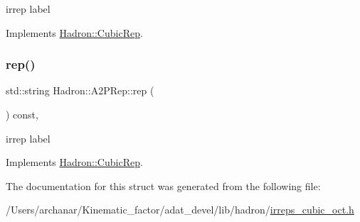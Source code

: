 irrep label 

Implements \mbox{\hyperlink{structHadron_1_1CubicRep_ac3eb63608803d44c68681f158e14eb1b}{Hadron\+::\+Cubic\+Rep}}.

\mbox{\label{structHadron_1_1A2PRep_aa2ba2d1bc832b1d1fdba1befcfe8a256}} 
\subsubsection{\texorpdfstring{rep()}{rep()}\hspace{0.1cm}{\footnotesize\ttfamily [2/2]}}
{\footnotesize\ttfamily std\+::string Hadron\+::\+A2\+P\+Rep\+::rep (\begin{DoxyParamCaption}{ }\end{DoxyParamCaption}) const\hspace{0.3cm}{\ttfamily [inline]}, {\ttfamily [virtual]}}

irrep label 

Implements \mbox{\hyperlink{structHadron_1_1CubicRep_ac3eb63608803d44c68681f158e14eb1b}{Hadron\+::\+Cubic\+Rep}}.



The documentation for this struct was generated from the following file\+:\begin{DoxyCompactItemize}
\item 
/\+Users/archanar/\+Kinematic\+\_\+factor/adat\+\_\+devel/lib/hadron/\mbox{\hyperlink{lib_2hadron_2irreps__cubic__oct_8h}{irreps\+\_\+cubic\+\_\+oct.\+h}}\end{DoxyCompactItemize}
